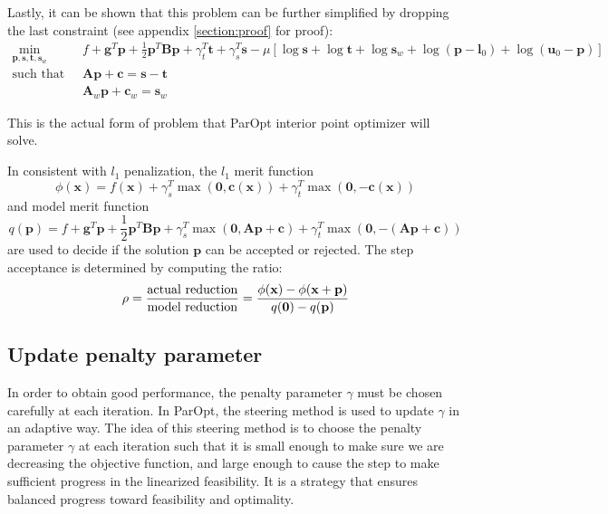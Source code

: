 \documentclass[12pt]{article}
\newcommand{\mb}{\mathbf}
\begin{document}
Lastly, it can be shown that this problem can be further simplified by dropping the last constraint (see appendix \ref{section:proof} for proof):
%
\begin{equation}
  \label{eqn:quad-problem-barrier-2}
  \begin{aligned}
    \min_{\mb{p}, \mb{s}, \mb{t}, \mb{s}_w} \qquad & f + \mb{g}^T\mb{p} + \frac{1}{2}\mb{p}^T\mb{B}\mb{p} + \gamma_t^T\mb{t} + \gamma_s^T\mb{s} - \mu \left[ \log \mb{s} + \log \mb{t} + \log \mb{s}_{w} + \log (\mb{p} - \mb{l}_0) + \log (\mb{u}_0 - \mb{p})  \right] \\
    \text{such that} \qquad
    & \mb{A}\mb{p} + \mb{c} = \mb{s} - \mb{t} \\
    & \mb{A}_{w}\mb{p} + \mb{c}_{w} = \mb{s}_w
  \end{aligned}
\end{equation}

This is the actual form of problem that ParOpt interior point optimizer will solve.

In consistent with $l_1$ penalization, the $l_1$ merit function
%
\begin{equation}
    \label{eqn:l1-merit-function}
    \phi(\mb{x}) = f(\mb{x}) + \gamma_s^T \max(\mb{0}, \mb{c}(\mb{x})) + \gamma_t^T \max(\mb{0}, -\mb{c}(\mb{x}))
\end{equation}
%
and model merit function
%
\begin{equation}
    \label{eqn:model-merit-function}
    q(\mb{p}) = f + \mb{g}^T\mb{p} + \frac{1}{2}\mb{p}^T\mb{B}\mb{p} + \gamma_s^T \max(\mb{0}, \mb{A}\mb{p} + \mb{c}) + \gamma_t^T \max(\mb{0}, -(\mb{A}\mb{p} + \mb{c}))
\end{equation}
%
are used to decide if the solution $\mb{p}$ can be accepted or rejected. The step acceptance is determined by computing the ratio:
\begin{equation}
    \label{eqn:rho_k}
    \rho = \frac{\mbox{actual reduction}}{\mbox{model reduction}} \\
    = \frac{\phi(\mb{x}) - \phi(\mb{x} + \mb{p})}{q(\mb{0}) - q(\mb{p})}
\end{equation}

\subsection{Update penalty parameter}
In order to obtain good performance, the penalty parameter $\gamma$ must be chosen carefully at each iteration. In ParOpt, the steering method is used to update $\gamma$ in an adaptive way. The idea of this steering method is to choose the penalty parameter $\gamma$ at each iteration such that it is small enough to make sure we are decreasing the objective function, and large enough to cause the step to make sufficient progress in the linearized feasibility. It is a strategy that ensures balanced progress toward feasibility and optimality.
\end{document}
